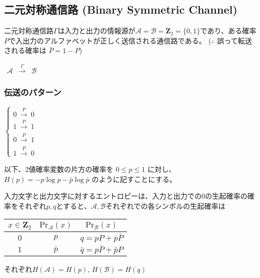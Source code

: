 \documentclass[12pt,a4paper]{article}
\begin{document}
\subsection*{二元対称通信路 (Binary Symmetric
Channel)}\label{ux4e8cux5143ux5bfeux79f0ux901aux4fe1ux8defbinary-symmetric-channel}

二元対称通信路$\Gamma$は入力と出力の情報源が$\mathcal{A} = \mathcal{B} = \mathbf{Z}_2 = \lbrace 0, 1 \rbrace$であり、ある確率$P$で入出力のアルファベットが正しく送信される通信路である。
($\therefore$ 誤って転送される確率は $\bar{P} = 1 - P$)

$
\begin{array}{ccc}
  \mathcal{A} & \overset{\Gamma}{\rightarrow} & \mathcal{B}
\end{array}
$

\subsubsection*{伝送のパターン}\label{ux4f1dux9001ux306eux30d1ux30bfux30fcux30f3}

$
\begin{cases}
0 \ \overset{P}{\rightarrow} \ 0 \\
1 \ \overset{P}{\rightarrow} \ 1 \\
0 \ \overset{\bar P}{\rightarrow} \ 1 \\
1 \ \overset{\bar P}{\rightarrow} \ 0
\end{cases}
$

以下、$2$値確率変数の片方の確率を $0 \leq p \leq 1$ に対し、
$H(p) = -p \log p - \bar{p} \log \bar{p}$ のように記すことにする。

入力文字と出力文字に対するエントロピーは、入力と出力での$0$の生起確率の確率をそれぞれ$p, q$とすると、$\mathcal{A}, \mathcal{B}$それぞれでの各シンボルの生起確率は

\begin{longtable}[]{@{}ccc@{}}
\toprule
$x \in \mathbf{Z}_2$ & $\text{Pr}_\mathcal{A} (x)$ &
$\text{Pr}_\mathcal{B} (x)$\tabularnewline
\midrule
\endhead
$0$ & $p$ & $q = pP + \bar{p} \bar{P}$\tabularnewline
$1$ & $\bar{p}$ & $\bar{q} = p \bar{P} + \bar{p} P$\tabularnewline
\bottomrule
\end{longtable}

それぞれ$H(\mathcal{A}) = H(p)$, $H(\mathcal{B}) = H(q)$
\end{document}

